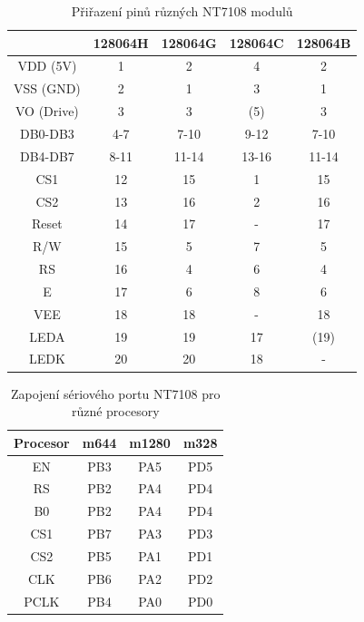 \begin{table}[H]
  \begin{center}
    \begin{tabular}{| c || c | c | c | c |}
    \hline
           & 128064H  &  128064G  & 128064C  & 128064B \\
    \hline
    \hline
  VDD (5V) &   1     &  2       &   4     & 2       \\
    \hline
  VSS (GND) &   2     &  1       &   3     & 1       \\
    \hline
 VO (Drive) &   3     &  3       &  (5)    & 3       \\
    \hline
  DB0-DB3   &   4-7   &  7-10    &   9-12  & 7-10    \\
    \hline
  DB4-DB7   &   8-11  &  11-14   &   13-16 & 11-14   \\
    \hline
  CS1       &   12    &  15      &   1     & 15      \\
  CS2       &   13    &  16      &   2     & 16      \\
    \hline
  Reset     &   14    &  17      &   -     & 17      \\
    \hline
  R/W       &   15    &  5       &   7     & 5       \\
    \hline
  RS        &   16    &  4       &   6     & 4       \\
    \hline
  E         &   17    &  6       &   8     & 6       \\
    \hline
  VEE       &   18    &  18      &   -     & 18      \\
    \hline
  LEDA      &   19    &  19      &   17    & (19)      \\
  LEDK      &   20    &  20      &   18    & -      \\
    \hline
    \end{tabular}
  \end{center}
  \caption{Přiřazení pinů různých NT7108 modulů}
  \label{tab:NT7108types}
\end{table}

\begin{table}[H]
  \begin{center}
    \begin{tabular}{| c || c | c | c |}
    \hline
 Procesor  & m644  &  m1280  & m328 \\
    \hline
    \hline
  EN        &  PB3  &  PA5   & PD5     \\
    \hline
  RS        &  PB2  &  PA4   & PD4      \\
  B0        &  PB2  &  PA4   & PD4      \\
    \hline
  CS1       &  PB7  &  PA3   & PD3      \\
    \hline
  CS2       &  PB5  &  PA1   & PD1      \\
    \hline
  CLK       &  PB6  &  PA2   & PD2      \\
    \hline
  PCLK      &  PB4  &  PA0   & PD0      \\
    \hline
    \end{tabular}
  \end{center}
  \caption{Zapojení sériového portu NT7108 pro různé procesory}
  \label{tab:7108-processor}
\end{table}


